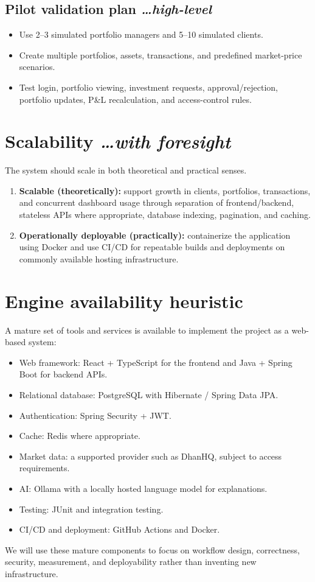 \documentclass[11pt,a4paper]{article}
\newcommand{\BvrHint}[1]{{\normalfont\normalsize\itshape\hfill #1}}
\begin{document}
\subsection{Pilot validation plan \BvrHint{\ldots high-level}}
\begin{itemize}[leftmargin=0.7cm]
\item Use 2--3 simulated portfolio managers and 5--10 simulated clients.
\item Create multiple portfolios, assets, transactions, and predefined market-price scenarios.
\item Test login, portfolio viewing, investment requests, approval/rejection, portfolio updates, P\&L recalculation, and access-control rules.
\end{itemize}

\section{Scalability \BvrHint{\ldots with foresight}}
The system should scale in both theoretical and practical senses.
\begin{enumerate}[leftmargin=0.7cm]
\item \textbf{Scalable (theoretically):} support growth in clients, portfolios, transactions, and concurrent dashboard usage through separation of frontend/backend, stateless APIs where appropriate, database indexing, pagination, and caching.
\item \textbf{Operationally deployable (practically):} containerize the application using Docker and use CI/CD for repeatable builds and deployments on commonly available hosting infrastructure.
\end{enumerate}

\section{Engine availability heuristic}
A mature set of tools and services is available to implement the project as a web-based system:
\begin{itemize}[leftmargin=0.7cm]
\item Web framework: React + TypeScript for the frontend and Java + Spring Boot for backend APIs.
\item Relational database: PostgreSQL with Hibernate / Spring Data JPA.
\item Authentication: Spring Security + JWT.
\item Cache: Redis where appropriate.
\item Market data: a supported provider such as DhanHQ, subject to access requirements.
\item AI: Ollama with a locally hosted language model for explanations.
\item Testing: JUnit and integration testing.
\item CI/CD and deployment: GitHub Actions and Docker.
\end{itemize}
We will use these mature components to focus on workflow design, correctness, security, measurement, and deployability rather than inventing new infrastructure.
\end{document}
